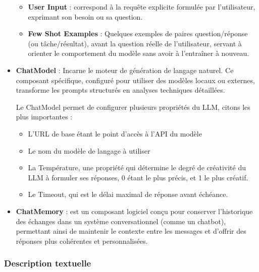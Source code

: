 \documentclass[12pt,a4paper]{report}
\begin{document}
\begin{itemize}
\begin{itemize}
			\item \textbf{User Input} : correspond à la requête explicite formulée par l’utilisateur, exprimant son besoin ou sa question.
			
			\item \textbf{Few Shot Examples} : Quelques exemples de paires question/réponse (ou tâche/résultat), avant la question réelle de l’utilisateur, servant à orienter le comportement du modèle sans avoir à l'entraîner à nouveau.
			
		\end{itemize}
		
		\item \textbf{ChatModel} : Incarne le moteur de génération de langage naturel. Ce composant spécifique, configuré pour utiliser des modèles locaux ou externes, transforme les prompts structurés en analyses techniques détaillées.
		
		Le ChatModel permet de configurer plusieurs propriétés du LLM, citons les plus importantes :
		
		\begin{itemize}
			
			\item L'URL de base étant le point d'accès à l'API du modèle
			
			\item Le nom du modèle de langage à utiliser
			
			\item La Température, une propriété qui détermine le degré de créativité du LLM à formuler ses réponses, 0 étant le plus précis, et 1 le plus créatif.
			
			\item Le Timeout, qui est le délai maximal de réponse avant échéance.
			
		\end{itemize}
		
		\item \textbf{ChatMemory} : est un composant logiciel conçu pour conserver l’historique des échanges dans un système conversationnel (comme un chatbot), permettant ainsi de maintenir le contexte entre les messages et d’offrir des réponses plus cohérentes et personnalisées.
		
	\end{itemize}
	
	\subsubsection{Description textuelle}
	
\end{document}
